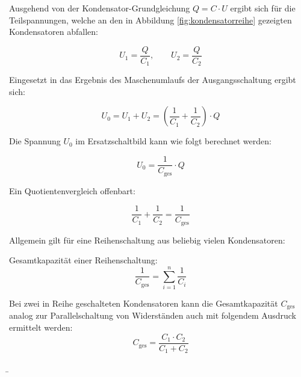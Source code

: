 \begin{frame}
{		Ausgehend von der Kondensator-Grundgleichung $Q = C \cdot U$ ergibt sich für die Teilspannungen, welche an den
		in Abbildung \ref{fig:kondensatorreihe} gezeigten Kondensatoren abfallen:

		\begin{equation*}
			U_1 = \frac{Q}{C_1}, \quad \quad U_2 = \frac{Q}{C_2}
		\end{equation*}

		Eingesetzt in das Ergebnis des Maschenumlaufs der Ausgangsschaltung ergibt sich:

		\begin{equation*}
			U_0 = U_1 + U_2 = \left( \frac{1}{C_1} + \frac{1}{C_2} \right) \cdot Q
		\end{equation*}

		Die Spannung $U_0$ im Ersatzschaltbild kann wie folgt berechnet werden:

		\begin{equation*}
			U_0 = \frac{1}{C_\mathrm{ges}} \cdot Q
		\end{equation*}

		Ein Quotientenvergleich offenbart:

		\begin{equation*}
			\frac{1}{C_1} + \frac{1}{C_2} = \frac{1}{C_\mathrm{ges}}
		\end{equation*}

		Allgemein gilt für eine Reihenschaltung aus beliebig vielen Kondensatoren:

		\begin{Merksatz}{Gesamtkapazität einer Reihenschaltung:}
			\begin{equation}
				\frac{1}{C_\mathrm{ges}} = \sum_{i = 1}^{n} \frac{1}{C_i}
			\end{equation}
		\end{Merksatz}


		Bei zwei in Reihe geschalteten Kondensatoren kann die Gesamtkapazität $C_\mathrm{ges}$ analog zur
		Parallelschaltung von Widerständen auch mit folgendem Ausdruck ermittelt werden:\\

		\begin{equation*}
			C_\mathrm{ges} = \frac{C_1 \cdot C_2}{C_1 + C_2}
		\end{equation*}


	}



	\b{
		\begin{columns}


\end{columns}}
\end{frame}
